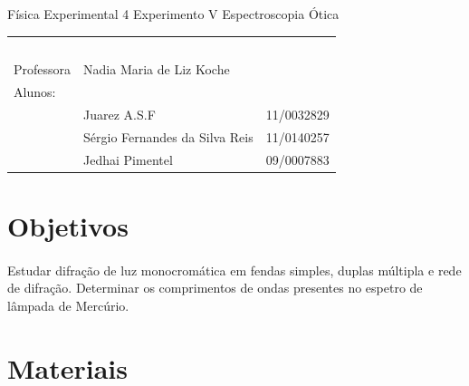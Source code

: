 \documentclass[a4paper,11pt]{article}
\begin{document}
\MakeMyTitlePage
{Física Experimental 4}
{Experimento V}
{Espectroscopia Ótica}
{%
		\begin{tabular}{llr} \
		& & \\[0.05cm]		
		Professora & Nadia Maria de Liz Koche & \\
		
		Alunos:& & \\
		& Juarez A.S.F 					& 11/0032829\\
		& Sérgio Fernandes da Silva Reis & 11/0140257\\
		& Jedhai Pimentel				& 09/0007883\\
	[0.05cm]	
		\end{tabular}
}

\section{Objetivos}
 \paragraph{}Estudar difração de luz monocromática em fendas simples, duplas
 múltipla e rede de difração. Determinar os comprimentos de ondas presentes
 no espetro de lâmpada de Mercúrio.
\section{Materiais}
\end{document}
